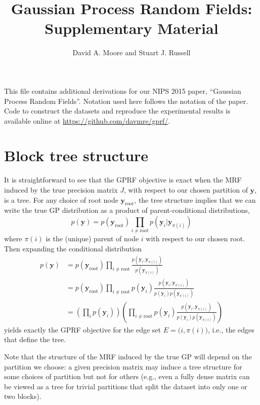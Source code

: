 \documentclass{article}
\renewcommand{\v}[1]{\mathbf{#1}}
\begin{document}
\title{Gaussian Process Random Fields: Supplementary Material}

\author{
David A. Moore and Stuart J. Russell\\
}

\maketitle

This file contains additional derivations for our NIPS 2015 paper, ``Gaussian Process Random Fields''. Notation used here follows the notation of the paper. Code to construct the datasets and reproduce the experimental results is available online at \url{https://github.com/davmre/gprf/}.

\section{Block tree structure}

It is straightforward to see that the GPRF objective is exact when the MRF induced by the true precision matrix $J$, with respect to our chosen partition of $\v{y}$, is a tree. For any choice of root node $\v{y}_\text{root}$, the tree structure implies that we can write the true GP distribution as a product of parent-conditional distributions,
\[p(\v{y}) = p(\v{y}_\text{root}) \prod_{i \ne \text{root}} p(\v{y}_i | \v{y}_{\pi(i)})\]
where $\pi(i)$ is the (unique) parent of node $i$ with respect to our chosen root. Then expanding the conditional distribution
\begin{align*}
p(\v{y}) &= p(\v{y}_\text{root}) \prod_{i \ne \text{root}} \frac{p(\v{y}_i , \v{y}_{\pi(i)})}{p(\v{y}_{\pi(i)})}\\
 &= p(\v{y}_\text{root}) \prod_{i \ne \text{root}} p(\v{y}_i) \frac{p(\v{y}_i , \v{y}_{\pi(i)})}{p(\v{y}_i) p(\v{y}_{\pi(i)}) }\\
 &= \left(\prod_{i} p(\v{y}_i) \right) \left(\prod_{i \ne \text{root}} p(\v{y}_i) \frac{p(\v{y}_i , \v{y}_{\pi(i)})}{p(\v{y}_i) p(\v{y}_{\pi(i)}) }\right)
\end{align*}
yields exactly the GPRF objective for the edge set $E={(i, \pi(i)})$, i.e., the edges that define the tree. 

Note that the structure of the MRF induced by the true GP will depend on the partition we choose: a given precision matrix may induce a tree structure for some choices of partition but not for others (e.g., even a fully dense matrix can be viewed as a tree for trivial partitions that split the dataset into only one or two blocks). 
\end{document}
